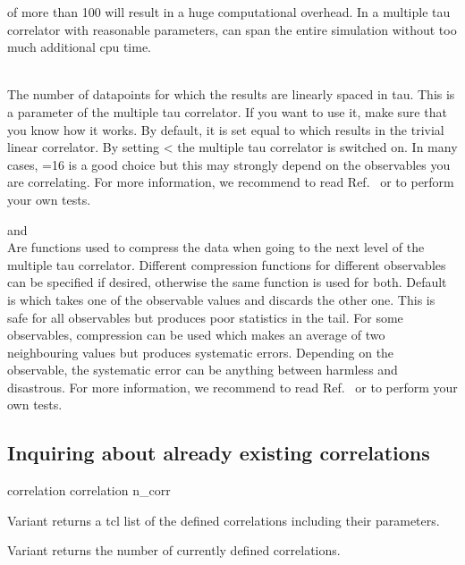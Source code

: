 \begin{arguments}
{  of more than 100 will result in a huge computational overhead.
  In a multiple tau correlator with reasonable parameters, 
   can span the entire simulation without
  too much additional cpu time.}
\item {} \\
  The number of datapoints for which the results are linearly spaced
  in tau.  This is a parameter of the multiple tau correlator. If you
  want to use it, make sure that you know how it works. By default, it
  is set equal to  which results in the trivial linear
  correlator. By setting  <  the multiple
  tau correlator is switched on. In many cases, =16 is a
  good choice but this may strongly depend on the observables you are
  correlating.  For more information, we recommend to read
  Ref.~\cite{ramirez10a} or to perform your own tests.
\item {} and  \\
  Are functions used to compress the data when going to the next level
  of the multiple tau correlator. Different compression functions for
  different observables can be specified if desired, otherwise the
  same function is used for both.  Default is  which
  takes one of the observable values and discards the other one. This
  is safe for all observables but produces poor statistics in the
  tail. For some observables,  compression can be used
  which makes an average of two neighbouring values but produces
  systematic errors.  Depending on the observable, the systematic
  error can be anything between harmless and disastrous. For more
  information, we recommend to read Ref.~\cite{ramirez10a} or to
  perform your own tests.
\end{arguments}

\subsection{Inquiring about already existing correlations}
\begin{essyntax}
 correlation 
 correlation n_corr
\end{essyntax}

Variant  returns a tcl list of the defined correlations
including their parameters.    

Variant  returns the number of currently
defined correlations.  
  
